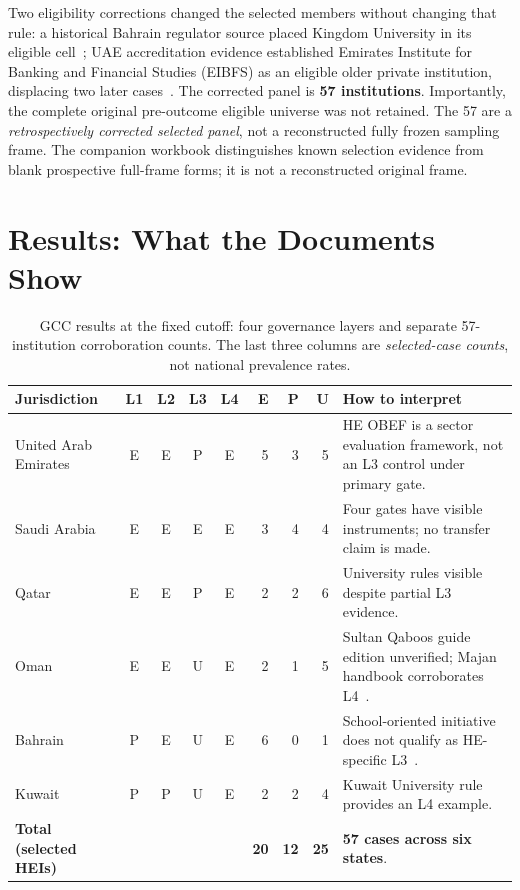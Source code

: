 \documentclass[conference,letterpaper]{IEEEtran}
\begin{document}
Two eligibility corrections changed the selected members without changing that rule: a historical Bahrain regulator source placed Kingdom University in its eligible cell~\cite{bqa1,bqa2}; UAE accreditation evidence established Emirates Institute for Banking and Financial Studies (EIBFS) as an eligible older private institution, displacing two later cases~\cite{caa1,caa2}. The corrected panel is \textbf{57 institutions}. Importantly, the complete original pre-outcome eligible universe was not retained. The 57 are a \emph{retrospectively corrected selected panel}, not a reconstructed fully frozen sampling frame. The companion workbook distinguishes known selection evidence from blank prospective full-frame forms; it is not a reconstructed original frame.

\section{Results: What the Documents Show}
\begin{table}[t]
\centering\caption{GCC results at the fixed cutoff: four governance layers and separate 57-institution corroboration counts. The last three columns are \emph{selected-case counts}, not national prevalence rates.}
\label{tab:core}\small
\setlength{\tabcolsep}{6pt}
\begin{tabularx}{\textwidth}{@{}p{}ccccrrrX@{}}
\toprule
Jurisdiction & L1 & L2 & L3 & L4 & E & P & U & How to interpret\tabularnewline\midrule
United Arab Emirates & E & E & P & E & 5 & 3 & 5 & HE OBEF is a sector evaluation framework, not an L3 control under primary gate.\tabularnewline
Saudi Arabia & E & E & E & E & 3 & 4 & 4 & Four gates have visible instruments; no transfer claim is made.\tabularnewline
Qatar & E & E & P & E & 2 & 2 & 6 & University rules visible despite partial L3 evidence.\tabularnewline
Oman & E & E & U & E & 2 & 1 & 5 & Sultan Qaboos guide edition unverified; Majan handbook corroborates L4~\cite{squ,majanhb}.\tabularnewline
Bahrain & P & E & U & E & 6 & 0 & 1 & School-oriented initiative does not qualify as HE-specific L3~\cite{bahrain}.\tabularnewline
Kuwait & P & P & U & E & 2 & 2 & 4 & Kuwait University rule provides an L4 example.\tabularnewline\midrule
\textbf{Total (selected HEIs)} & & & & & \textbf{20} & \textbf{12} & \textbf{25} & \textbf{57 cases across six states}.\tabularnewline\bottomrule
\end{tabularx}
\end{table}
\end{document}
